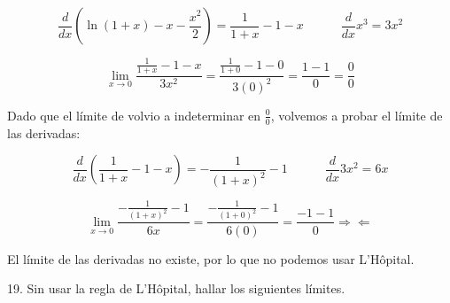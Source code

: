 \documentclass[12pt]{article}
\begin{document}
\begin{enumerate}[\hspace{9px} a)]
        \begin{equation*}
            \frac{d}{dx}\left(\ln(1+x)-x-\frac{x^2}{2}\right) = \frac{1}{1+x}-1-x \qquad \quad \frac{d}{dx}x^3=3x^2
        \end{equation*}

        \begin{equation*}
            \lim_{x \to 0}\frac{\frac{1}{1+x}-1-x}{3x^2} = \frac{\frac{1}{1+0}-1-0}{3(0)^2} = \frac{1-1}{0} = \frac{0}{0}
        \end{equation*}

        Dado que el l\'imite de volvio a indeterminar en \(\displaystyle\frac{0}{0}\), volvemos a probar el l\'imite de las derivadas:

        \begin{equation*}
            \frac{d}{dx}\left(\frac{1}{1+x}-1-x\right)= -\frac{1}{(1+x)^2}-1 \qquad \quad \frac{d}{dx}3x^2=6x
        \end{equation*}

        \begin{equation*}
            \lim_{x \to 0}\frac{-\frac{1}{(1+x)^2}-1}{6x} = \frac{-\frac{1}{(1+0)^2}-1}{6(0)} = \frac{-1-1}{0} \Rightarrow\!\Leftarrow
        \end{equation*}

        El l\'imite de las derivadas no existe, por lo que no podemos usar L'H\^opital.\bigskip

\end{enumerate}

19. Sin usar la regla de L'H\^opital, hallar los siguientes l\'imites.
\end{document}
